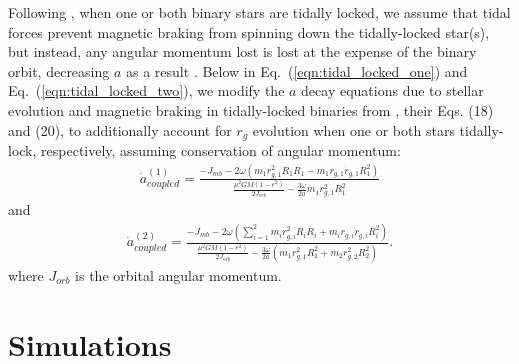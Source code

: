 \documentclass[twocolumn]{aastex61}
\begin{document}
Following \citet{Fleming2018}, when one or both binary stars are tidally locked, we assume that tidal forces prevent magnetic braking from spinning down the tidally-locked star(s), but instead, any angular momentum lost is lost at the expense of the binary orbit, decreasing $a$ as a result \citep{Verbunt1981}.  Below in Eq.~(\ref{eqn:tidal_locked_one}) and Eq.~(\ref{eqn:tidal_locked_two}), we modify the $a$ decay equations due to stellar evolution and magnetic braking in tidally-locked binaries from \citet{Fleming2018}, their Eqs. (18) and (20), to additionally account for $r_g$ evolution when one or both stars tidally-lock, respectively, assuming conservation of angular momentum:
\small
\begin{equation} \label{eqn:tidal_locked_one}
\begin{split}
\dot{a}_{coupled}^{(1)} = \frac{-\dot{J}_{mb} - 2 \omega \left( m_1 r_{g,1}^2 R_1 \dot{R_1} - m_1 r_{g,1} \dot{r}_{g,1} R_1^2 \right)}
{\frac{\mu^2 G M (1-e^2)}{2J_{orb}} - \frac{3 \omega}{2a} m_1 r_{g,1}^2 R_1^2}
\end{split}
\end{equation}
\normalsize
and
\small
\begin{equation} \label{eqn:tidal_locked_two}
\begin{split}
\dot{a}_{coupled}^{(2)} = \frac{-\dot{J}_{mb} - 2 \omega \left( \sum_{i=1}^{2} m_i r_{g,i}^2 R_i \dot{R_i} + m_i r_{g,i} \dot{r}_{g,i} R_i^2 \right)}
{\frac{\mu^2 G M (1-e^2)}{2J_{orb}} - \frac{3 \omega}{2a} \left( m_1 r_{g,1}^2 R_1^2 + m_2 r_{g,2}^2 R_2^2 \right)}.
\end{split}
\end{equation}
\normalsize
where $J_{orb}$ is the orbital angular momentum.

\section{Simulations} \label{sec:simulations}
\end{document}
